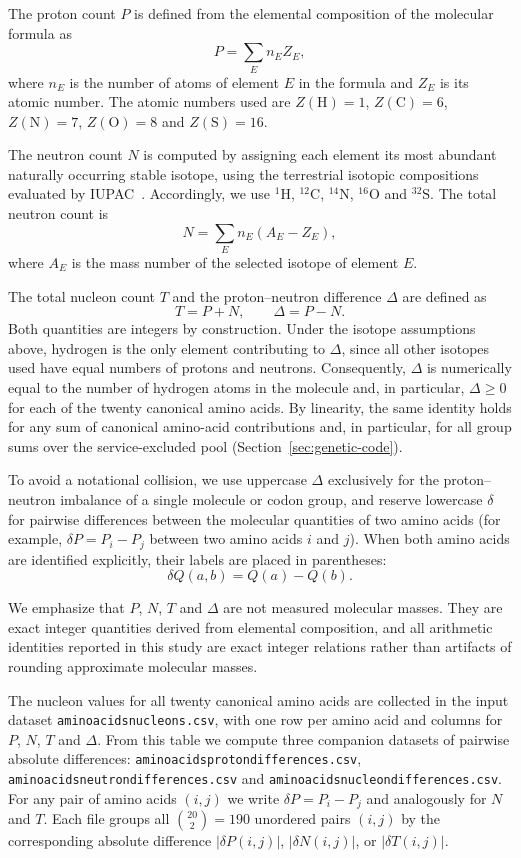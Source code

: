 \documentclass[11pt,a4paper]{article}
\renewcommand{\_}{\origunderscore\allowbreak}
\begin{document}
The proton count $P$ is defined from the elemental composition of the
molecular formula as
\[
P = \sum_E n_E Z_E,
\]
where $n_E$ is the number of atoms of element $E$ in the formula and
$Z_E$ is its atomic number. The atomic numbers used are
$Z(\mathrm{H}) = 1$, $Z(\mathrm{C}) = 6$, $Z(\mathrm{N}) = 7$,
$Z(\mathrm{O}) = 8$ and $Z(\mathrm{S}) = 16$.

The neutron count $N$ is computed by assigning each element its most
abundant naturally occurring stable isotope, using the terrestrial
isotopic compositions evaluated by IUPAC~\cite{berglund2011}.
Accordingly, we use $^{1}\mathrm{H}$, $^{12}\mathrm{C}$,
$^{14}\mathrm{N}$, $^{16}\mathrm{O}$ and $^{32}\mathrm{S}$. The total
neutron count is
\[
N = \sum_E n_E (A_E - Z_E),
\]
where $A_E$ is the mass number of the selected isotope of element $E$.

The total nucleon count $T$ and the proton--neutron difference
$\Delta$ are defined as
\[
T = P + N, \qquad \Delta = P - N.
\]
Both quantities are integers by construction. Under the isotope
assumptions above, hydrogen is the only element contributing to
$\Delta$, since all other isotopes used have equal numbers of protons
and neutrons. Consequently, $\Delta$ is numerically equal to the number of hydrogen
atoms in the molecule and, in particular, $\Delta \geq 0$ for each of
the twenty canonical amino acids. By linearity, the same identity
holds for any sum of canonical amino-acid contributions and, in
particular, for all group sums over the service-excluded pool
(Section~\ref{sec:genetic-code}).

To avoid a notational collision, we use uppercase $\Delta$ exclusively
for the proton--neutron imbalance of a single molecule or codon group,
and reserve lowercase $\delta$ for pairwise differences between the
molecular quantities of two amino acids (for example, $\delta P=P_i-P_j$
between two amino acids
$i$ and $j$). When both amino acids are identified explicitly, their
labels are placed in parentheses:
\[
\delta Q(a,b)=Q(a)-Q(b).
\]

We emphasize that $P$, $N$, $T$ and $\Delta$ are not measured
molecular masses. They are exact integer quantities derived from
elemental composition, and all arithmetic identities reported in this
study are exact integer relations rather than artifacts of rounding
approximate molecular masses.

The nucleon values for all twenty canonical amino acids are collected
in the input dataset \texttt{amino\_acids\_nucleons.csv}, with one
row per amino acid and columns for $P$, $N$, $T$ and $\Delta$. From
this table we compute three companion datasets of pairwise absolute
differences: \texttt{amino\_acids\_proton\_differences.csv},
\texttt{amino\_acids\_neutron\_differences.csv} and
\texttt{amino\_acids\_nucleon\_differences.csv}. For any pair of amino
acids $(i, j)$ we write $\delta P = P_i - P_j$ and analogously for
$N$ and $T$. Each file groups all $\binom{20}{2} = 190$ unordered pairs $(i,j)$
by the corresponding absolute difference $|\delta P(i,j)|$,
$|\delta N(i,j)|$, or $|\delta T(i,j)|$.
\end{document}
